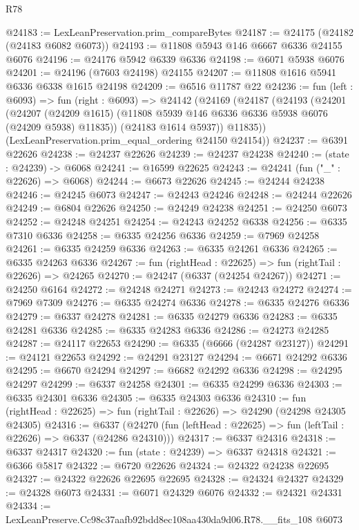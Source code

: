 \begin{lexlean}{R78}
\begin{coremodule}
@24183 := LexLeanPreservation.prim_compareBytes
@24187 := @24175 (@24182 (@24183 @6082 @6073))
@24193 := @11808 @5943 @146 @6667 @6336 @24155 @6076
@24196 := @24176 @5942 @6339 @6336
@24198 := @6071 @5938 @6076
@24201 := @24196 (@7603 @24198) @24155
@24207 := @11808 @1616 @5941 @6336 @6338 @1615 @24198
@24209 := @6516 @11787 @22
@24236 := fun (left : @6093) =>
  fun (right : @6093) =>
  @24142
    (@24169
      (@24187
        (@24193
          (@24201
            (@24207
              (@24209 @1615)
              (@11808 @5939 @146 @6336 @6336 @5938 @6076 (@24209 @5938) @11835))
            (@24183 @1614 @5937))
          @11835))
      (LexLeanPreservation.prim_equal_ordering @24150 @24154))
@24237 := @6391 @22626
@24238 := @24237 @22626
@24239 := @24237 @24238
@24240 := (state : @24239) -> @6068
@24241 := @16599 @22625
@24243 := @24241 (fun ("_" : @22626) => @6068)
@24244 := @6673 @22626
@24245 := @24244 @24238
@24246 := @24245 @6073
@24247 := @24243 @24246
@24248 := @24244 @22626
@24249 := @6804 @22626
@24250 := @24249 @24238
@24251 := @24250 @6073
@24252 := @24248 @24251
@24254 := @24243 @24252 @6338
@24256 := @6335 @7310 @6336
@24258 := @6335 @24256 @6336
@24259 := @7969 @24258
@24261 := @6335 @24259 @6336
@24263 := @6335 @24261 @6336
@24265 := @6335 @24263 @6336
@24267 := fun (rightHead : @22625) => fun (rightTail : @22626) => @24265
@24270 := @24247 (@6337 (@24254 @24267))
@24271 := @24250 @6164
@24272 := @24248 @24271
@24273 := @24243 @24272
@24274 := @7969 @7309
@24276 := @6335 @24274 @6336
@24278 := @6335 @24276 @6336
@24279 := @6337 @24278
@24281 := @6335 @24279 @6336
@24283 := @6335 @24281 @6336
@24285 := @6335 @24283 @6336
@24286 := @24273 @24285
@24287 := @24117 @22653
@24290 := @6335 (@6666 (@24287 @23127))
@24291 := @24121 @22653
@24292 := @24291 @23127
@24294 := @6671 @24292 @6336
@24295 := @6670 @24294
@24297 := @6682 @24292 @6336
@24298 := @24295 @24297
@24299 := @6337 @24258
@24301 := @6335 @24299 @6336
@24303 := @6335 @24301 @6336
@24305 := @6335 @24303 @6336
@24310 := fun (rightHead : @22625) => fun (rightTail : @22626) => @24290 (@24298 @24305 @24305)
@24316 := @6337
    (@24270 (fun (leftHead : @22625) => fun (leftTail : @22626) => @6337 (@24286 @24310)))
@24317 := @6337 @24316
@24318 := @6337 @24317
@24320 := fun (state : @24239) => @6337 @24318
@24321 := @6366 @5817
@24322 := @6720 @22626
@24324 := @24322 @24238 @22695
@24327 := @24322 @22626 @22695 @22695
@24328 := @24324 @24327
@24329 := @24328 @6073
@24331 := @6071 @24329 @6076
@24332 := @24321 @24331
@24334 := LexLeanPreserve.Cc98c37aafb92bdd8ec108aa430da9d06.R78.__fits_108 @6073

\end{coremodule}
\end{lexlean}
